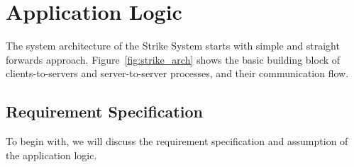 \documentclass[dareport.tex]{subfiles}
\begin{document}
\section{Application Logic}
The system architecture of the Strike System starts with simple and straight forwards approach. Figure~\ref{fig:strike_arch} shows the basic building block of clients-to-servers and server-to-server processes, and their communication flow.


\subsection{Requirement Specification}
To begin with, we will discuss the requirement specification and assumption of the application logic. 
\end{document}
